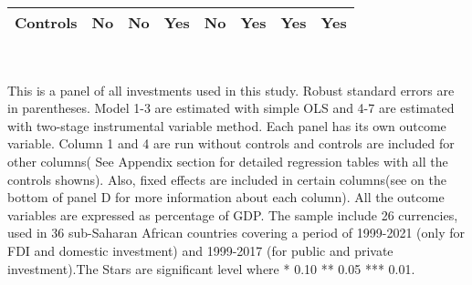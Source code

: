 \begin{table}[H]
\begin{adjustbox}{max width=\textwidth}
\begin{tabular}{l*{7}{c}}
Controls    &          No         &          No         &         Yes         &          No         &         Yes         &         Yes         &         Yes         \\
\bottomrule \end{tabular} \end{adjustbox} \\                 \footnotesize \item This is a panel of all investments used in this study. Robust standard errors are in parentheses. Model 1-3 are estimated with simple OLS and 4-7 are estimated with two-stage instrumental variable method. Each panel has its own outcome variable. Column 1 and 4 are run without controls and controls are included for other columns( See Appendix section for detailed regression tables with all the controls showns). Also, fixed effects are included in certain columns(see on the bottom of panel D for more information about each column). All the outcome variables are expressed as percentage of GDP. The sample include 26 currencies, used in 36 sub-Saharan African countries covering a period of 1999-2021 (only for FDI and domestic investment) and 1999-2017 (for public and private investment).The Stars are significant level where * 0.10 ** 0.05 *** 0.01. \end{table}
